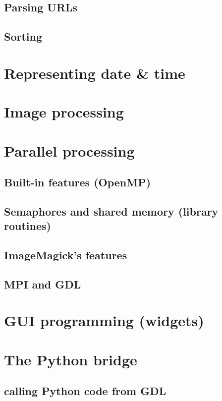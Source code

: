 \documentclass[10pt,titleauthor,openany]{mwbk}
\begin{document}
  \section{Parsing URLs}
  \section{Sorting}

  \chapter{Representing date \& time}

  \chapter{Image processing}
  
  \chapter{Parallel processing}
  \section{Built-in features (OpenMP)}
  
  \section{Semaphores and shared memory (library routines)}
  
  \section{ImageMagick's features}
  \section{MPI and GDL}

  \chapter{GUI programming (widgets)}
  
 
  \chapter{The Python bridge}
  \section{calling Python code from GDL}
\end{document}
